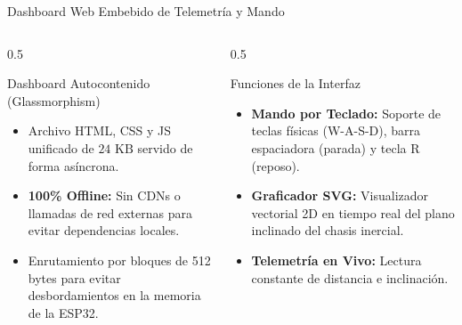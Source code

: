 \documentclass[10pt, aspectratio=169]{beamer}
\begin{document}
\begin{frame}{Dashboard Web Embebido de Telemetría y Mando}
    \begin{columns}
        \begin{column}{0.5\textwidth}
            \begin{block}{Dashboard Autocontenido (Glassmorphism)}
                \begin{itemize}
                    \item Archivo HTML, CSS y JS unificado de $24\text{ KB}$ servido de forma asíncrona.
                    \item \textbf{100\% Offline:} Sin CDNs o llamadas de red externas para evitar dependencias locales.
                    \item Enrutamiento por bloques de 512 bytes para evitar desbordamientos en la memoria de la ESP32.
                \end{itemize}
            \end{block}
        \end{column}
        \begin{column}{0.5\textwidth}
            \begin{alertblock}{Funciones de la Interfaz}
                \begin{itemize}
                    \item \textbf{Mando por Teclado:} Soporte de teclas físicas (W-A-S-D), barra espaciadora (parada) y tecla R (reposo).
                    \item \textbf{Graficador SVG:} Visualizador vectorial 2D en tiempo real del plano inclinado del chasis inercial.
                    \item \textbf{Telemetría en Vivo:} Lectura constante de distancia e inclinación.
                \end{itemize}
            \end{alertblock}
        \end{column}
    \end{columns}
\end{frame}
\end{document}
